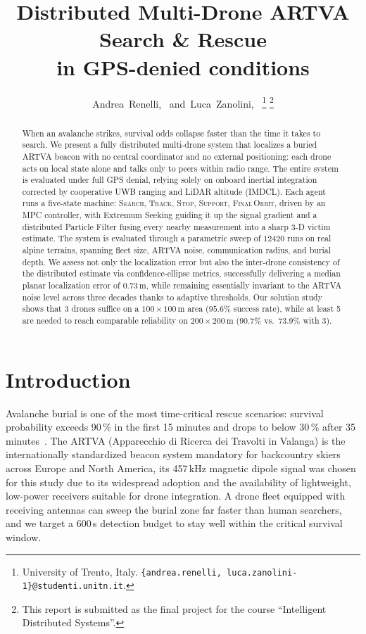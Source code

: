 \documentclass[journal,10pt,twocolumn]{IEEEtran}
\title{Distributed Multi-Drone ARTVA Search \& Rescue\\
       in GPS-denied conditions}
\author{Andrea~Renelli,~\IEEEmembership{Student,~University~of~Trento}
        and~Luca~Zanolini,~\IEEEmembership{Student,~University~of~Trento}%
\thanks{University of Trento, Italy.
  \texttt{\{andrea.renelli, luca.zanolini-1\}@studenti.unitn.it}.}
\thanks{This report is submitted as the final project for the course
  ``Intelligent Distributed Systems''.}}
\begin{document}
\maketitle

\begin{abstract}
When an avalanche strikes, survival odds collapse faster than the time it takes to search.
We present a fully distributed multi-drone system that localizes a
buried ARTVA beacon with no central coordinator and no
external positioning: each drone acts on local state alone and talks
only to peers within radio range.
The entire system is evaluated under full GPS denial, relying solely on
onboard inertial integration corrected by cooperative UWB ranging and
LiDAR altitude (IMDCL).
Each agent runs a five-state machine: \textsc{Search},
\textsc{Track}, \textsc{Stop}, \textsc{Support}, \textsc{Final\,Orbit}, driven by an MPC
controller, with Extremum Seeking guiding it up the signal gradient and
a distributed Particle Filter fusing every nearby measurement into a
sharp 3-D victim estimate.
The system is evaluated through a parametric sweep of $12420$ runs on real
alpine terrains, spanning fleet size, ARTVA noise, communication radius, and
burial depth. We assess not only the localization error but also the
inter-drone consistency of the distributed estimate via confidence-ellipse
metrics, successfully delivering a median planar localization
error of $0.73$\,m, while
remaining essentially invariant to the ARTVA noise level across three
decades thanks to adaptive thresholds.  Our solution study shows that 3 drones suffice on a $100\times100$\,m area
($95.6\%$ success rate), while at least 5 are needed to reach comparable reliability on
$200\times200$\,m ($90.7\%$ vs.\ $73.9\%$ with 3).
\end{abstract}

\section{Introduction}
\label{sec:intro}
Avalanche burial is one of the most time-critical rescue scenarios:
survival probability exceeds 90\,\% in the first 15 minutes and drops
to below 30\,\% after 35 minutes~\cite{Falk1994}.
The ARTVA (Apparecchio di Ricerca dei Travolti in Valanga) is the
internationally standardized beacon system mandatory for backcountry
skiers across Europe and North America, its 457\,kHz magnetic dipole
signal was chosen for this study due to its widespread adoption and the availability of
lightweight, low-power receivers suitable for drone integration. A drone fleet equipped with
receiving antennas can sweep the burial zone far faster than human
searchers, and we target a $600$\,s detection budget to stay well within
the critical survival window.
\end{document}
